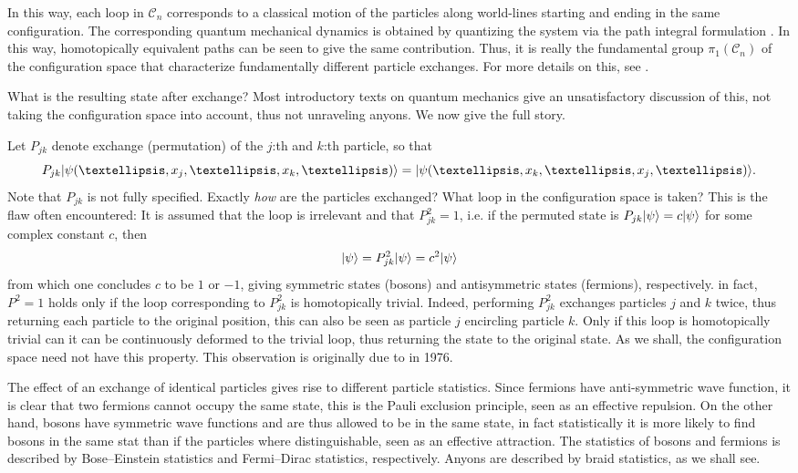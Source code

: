 \documentclass[a4paper,10pt,oneside]{book}
\theoremstyle{plain}
\theoremstyle{definition}
\theoremstyle{remark}
\DeclarePairedDelimiter\ket{\lvert}{\rangle}
\begin{document}
In this way, each loop in $\mathcal{C}_n$ corresponds to a classical motion of the particles along world-lines starting and ending in the same configuration. The corresponding quantum mechanical dynamics is obtained by quantizing the system via the path integral formulation \cite{feynmann path integral,nakahara,feynmann path integrals indistinguishable particles,myrheim}. In this way, homotopically equivalent paths can be seen to give the same contribution. Thus, it is really the fundamental group $\pi_1(\mathcal{C}_n)$ of the configuration space that characterize fundamentally different particle exchanges. For more details on this, see \cite{bonderson,configuration spaces}.

What is the resulting state after exchange? Most introductory texts on quantum mechanics give an unsatisfactory discussion of this, not taking the configuration space into account, thus not unraveling anyons. We now give the full story.

Let $P_{jk}$ denote exchange (permutation) of the $j$:th and $k$:th particle, so that
\begin{equation}
  P_{jk}\ket{\psi(…,x_j,…,x_k,…)} = \ket{\psi(…,x_k,…,x_j,…)}.
\end{equation}
Note that $P_{jk}$ is not fully specified. Exactly \emph{how} are the particles exchanged? What loop in the configuration space is taken? This is the flaw often encountered: It is assumed that the loop is irrelevant and that $P_{jk}^2 = 1$, i.e. if the permuted state is $P_{jk}\ket{\psi} = c\ket{\psi}$ for some complex constant $c$, then
\begin{equation}
  \ket{\psi} = P_{jk}^2 \ket{\psi} = c^2 \ket{\psi}
\end{equation}
from which one concludes $c$ to be $1$ or $-1$, giving symmetric states (bosons) and antisymmetric states (fermions), respectively. in fact, $P^2 = 1$ holds only if the loop corresponding to $P_{jk}^2$ is homotopically trivial. Indeed, performing $P_{jk}^2$ exchanges particles $j$ and $k$ twice, thus returning each particle to the original position, this can also be seen as particle $j$ encircling particle $k$. Only if this loop is homotopically trivial can it can be continuously deformed to the trivial loop, thus returning the state to the original state. As we shall, the configuration space need not have this property. This observation is originally due to \cite{leinaas myrheim} in 1976.

The effect of an exchange of identical particles gives rise to different particle statistics. Since fermions have anti-symmetric wave function, it is clear that two fermions cannot occupy the same state, this is the Pauli exclusion principle, seen as an effective repulsion. On the other hand, bosons have symmetric wave functions and are thus allowed to be in the same state, in fact statistically it is more likely to find bosons in the same stat than if the particles where distinguishable, seen as an effective attraction. The statistics of bosons and fermions is described by Bose–Einstein statistics and Fermi–Dirac statistics, respectively. Anyons are described by braid statistics, as we shall see.
\end{document}
